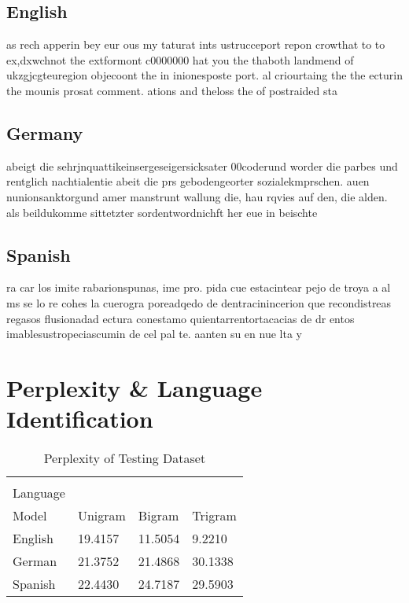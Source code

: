 \documentclass{article}
\begin{document}
\subsection{English}
as rech apperin bey eur ous my taturat ints ustrucceport repon crowthat to to ex,dxwchnot the extformont c0000000  hat you the thaboth landmend of ukzgjcgteuregion objecoont the in inionesposte port.
al criourtaing the the ecturin the mounis prosat comment.
ations and theloss the of postraided sta

\subsection{Germany}
abeigt die sehrjnquattikeinsergeseigersicksater 00coderund worder die parbes und rentglich nachtialentie abeit die prs gebodengeorter sozialekmprschen.
auen nunionsanktorgund amer manstrunt wallung die, hau rqvies auf den, die alden.
als beildukomme sittetzter sordentwordnichft her eue in beischte

\subsection{Spanish}
ra car los imite rabarionspunas, ime pro.
pida cue estacintear pejo de troya a al ms se lo re cohes la cuerogra poreadqedo de dentracinincerion que recondistreas regasos flusionadad ectura conestamo quientarrentortacacias de dr entos imablesustropeciascumin de cel pal te.
aanten su en nue lta y 

\section{Perplexity \& Language Identification}\label{Per}

\begin{table}[h]
	\centering
	\begin{tabular}{|l|l|l|l|}\hline
		\diagbox[width=10em]{\\Language}{\\Model}&
		Unigram & Bigram  & Trigram \\ \hline
		English & 19.4157 & 11.5054 & 9.2210 \\ \hline
		German  & 21.3752 & 21.4868 & 30.1338 \\ \hline
		Spanish & 22.4430 & 24.7187 & 29.5903 \\ \hline
	\end{tabular}
	\caption{Perplexity of Testing Dataset}\label{tab:perplexity}
\end{table}
\end{document}
